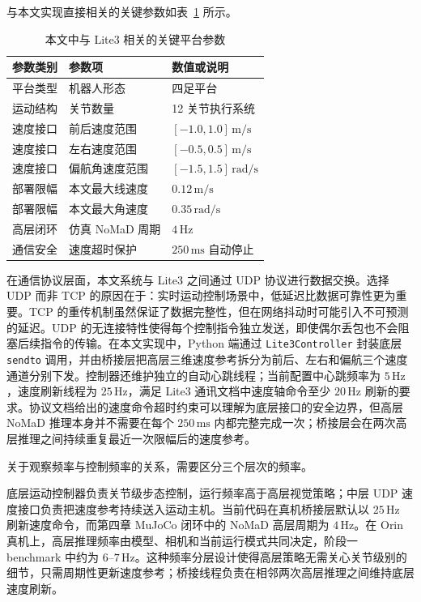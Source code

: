 与本文实现直接相关的关键参数如表~\ref{tab:lite3-params} 所示。
\begin{table}[htbp]
    \centering
    \caption{本文中与 Lite3 相关的关键平台参数}
    \label{tab:lite3-params}
    \begin{tabular}{lll}
        \toprule
        参数类别 & 参数项 & 数值或说明 \\
        \midrule
        平台类型 & 机器人形态 & 四足平台 \\
        运动结构 & 关节数量 & 12 关节执行系统 \\
        速度接口 & 前后速度范围 & $[-1.0,1.0]\,\text{m/s}$ \\
        速度接口 & 左右速度范围 & $[-0.5,0.5]\,\text{m/s}$ \\
        速度接口 & 偏航角速度范围 & $[-1.5,1.5]\,\text{rad/s}$ \\
        部署限幅 & 本文最大线速度 & $0.12\,\text{m/s}$ \\
        部署限幅 & 本文最大角速度 & $0.35\,\text{rad/s}$ \\
        高层闭环 & 仿真 NoMaD 周期 & $4\,\text{Hz}$ \\
        通信安全 & 速度超时保护 & $250\,\text{ms}$ 自动停止 \\
        \bottomrule
    \end{tabular}
\end{table}

在通信协议层面，本文系统与 Lite3 之间通过 UDP 协议进行数据交换。选择 UDP 而非 TCP 的原因在于：实时运动控制场景中，低延迟比数据可靠性更为重要。TCP 的重传机制虽然保证了数据完整性，但在网络抖动时可能引入不可预测的延迟。UDP 的无连接特性使得每个控制指令独立发送，即使偶尔丢包也不会阻塞后续指令的传输。在本文实现中，Python 端通过 \texttt{Lite3Controller} 封装底层 \texttt{sendto} 调用，并由桥接层把高层三维速度参考拆分为前后、左右和偏航三个速度通道分别下发。控制器还维护独立的自动心跳线程；当前配置中心跳频率为 $5\,\text{Hz}$，速度刷新线程为 $25\,\text{Hz}$，满足 Lite3 通讯文档中速度轴命令至少 $20\,\text{Hz}$ 刷新的要求。协议文档给出的速度命令超时约束可以理解为底层接口的安全边界，但高层 NoMaD 推理本身并不需要在每个 $250\,\text{ms}$ 内都完整完成一次；桥接层会在两次高层推理之间持续重复最近一次限幅后的速度参考。

关于观察频率与控制频率的关系，需要区分三个层次的频率。

底层运动控制器负责关节级步态控制，运行频率高于高层视觉策略；中层 UDP 速度接口负责把速度参考持续送入运动主机。当前代码在真机桥接层默认以 $25\,\text{Hz}$ 刷新速度命令，而第四章 MuJoCo 闭环中的 NoMaD 高层周期为 $4\,\text{Hz}$。在 Orin 真机上，高层推理频率由模型、相机和当前运行模式共同决定，阶段一 benchmark 中约为 $6\text{--}7\,\text{Hz}$。这种频率分层设计使得高层策略无需关心关节级别的细节，只需周期性更新速度参考；桥接线程负责在相邻两次高层推理之间维持底层速度刷新。

